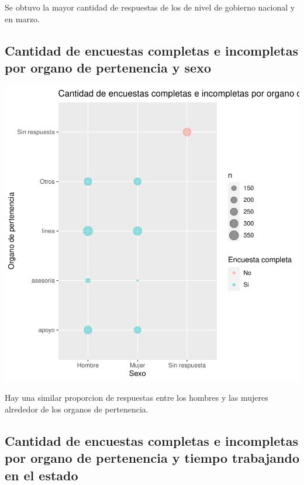 \documentclass{article}
\begin{document}
Se obtuvo la mayor cantidad de respuestas de los de nivel de gobierno nacional y en marzo.

\subsection{Cantidad de encuestas completas e incompletas por organo de pertenencia y sexo}

\includegraphics{seguimientov3-029}

Hay una similar proporcion de respuestas entre los hombres y las mujeres alrededor de los organos de pertenencia.

\subsection{Cantidad de encuestas completas e incompletas por organo de pertenencia y tiempo trabajando en el estado}
\end{document}

